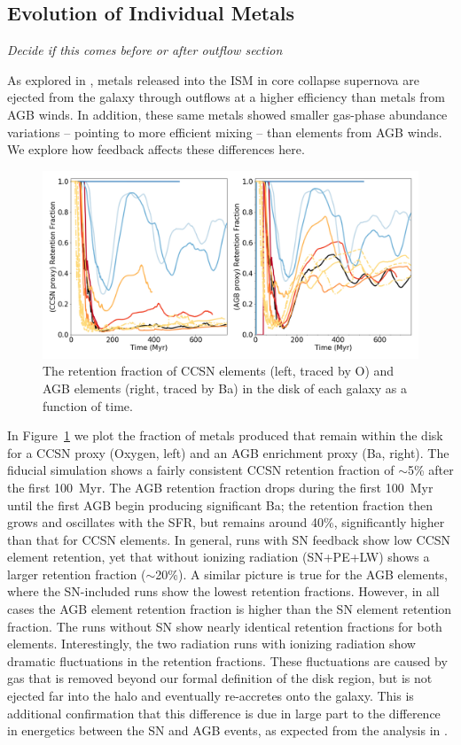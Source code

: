\documentclass[twocolumn]{aastex62}
\begin{document}
\subsection{Evolution of Individual Metals}
\textit{Decide if this comes before or after outflow section}

As explored in \citep{Emerick2018b}, metals released into the ISM in core collapse supernova are ejected from the galaxy through outflows at a higher efficiency than metals from AGB winds. In addition, these same metals showed smaller gas-phase abundance variations -- pointing to more efficient mixing -- than elements from AGB winds. We explore how feedback affects these differences here.

\begin{figure}
  \centering
  \includegraphics[width=0.95\linewidth]{figures/physics_comparison_retention}
  \caption{The retention fraction of CCSN elements (left, traced by O) and AGB elements (right, traced by Ba) in the disk of each galaxy as a function of time.}
  \label{fig:retention}
\end{figure}

In Figure~\ref{fig:retention} we plot the fraction of metals produced that remain within the disk for a CCSN proxy (Oxygen, left) and an AGB enrichment proxy (Ba, right). The fiducial simulation shows a fairly consistent CCSN retention fraction of $\sim$5\% after the first 100~Myr. The AGB retention fraction drops during the first 100~Myr until the first AGB begin producing significant Ba; the retention fraction then grows and oscillates with the SFR, but remains around 40\%, significantly higher than that for CCSN elements. In general, runs with SN feedback show low CCSN element retention, yet that without ionizing radiation (SN+PE+LW) shows a larger retention fraction ($\sim$20\%). A similar picture is true for the AGB elements, where the SN-included runs show the lowest retention fractions. However, in all cases the AGB element retention fraction is higher than the SN element retention fraction. The runs without SN show nearly identical retention fractions for both elements. Interestingly, the two radiation runs with ionizing radiation show dramatic fluctuations in the retention fractions. These fluctuations are caused by gas that is removed beyond our formal definition of the disk region, but is not ejected far into the halo and eventually re-accretes onto the galaxy. This is additional confirmation that this difference is due in large part to the difference in energetics between the SN and AGB events, as expected from the analysis in \cite{Emerick2020a}. 
\end{document}
